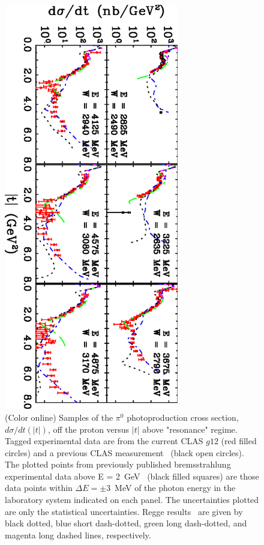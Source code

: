 \documentclass[aps,prc,twocolumn,floatfix,showpacs,preprintnumbers,amsmath,amssymb,superscriptaddress]{revtex4-1}
\begin{document}
\begin{figure}[htb!]
\centerline{
        \includegraphics[width=3in, angle=90]{dsdt.eps}}

        \caption {(Color online) Samples of the $\pi^0$ 
		photoproduction cross section, $d\sigma/dt(|t|)$, 
		off the proton versus $|t|$ above "resonance" 
		regime.  Tagged experimental data are from the 
		current CLAS $g12$ (red filled circles) and a previous CLAS 
		measurement~\protect\cite{du07} (black open circles). 
		The plotted points from previously published 
		bremsstrahlung experimental data above E = 
		2~GeV~\protect\cite{brem} (black filled squares) 
		are those data points within $\Delta E = \pm$3~MeV 
		of the photon energy in the laboratory system indicated on 
		each panel. The uncertainties plotted are only the statistical uncertainties. 
		Regge results~\protect\cite{Goldstein,Laget,
		Mathieu,Donnachie} are given by black dotted, 
		blue short dash-dotted, green long dash-dotted, 
		and magenta long dashed lines, respectively.} 
		\label{fig:t_data}
\end{figure}
\end{document}
